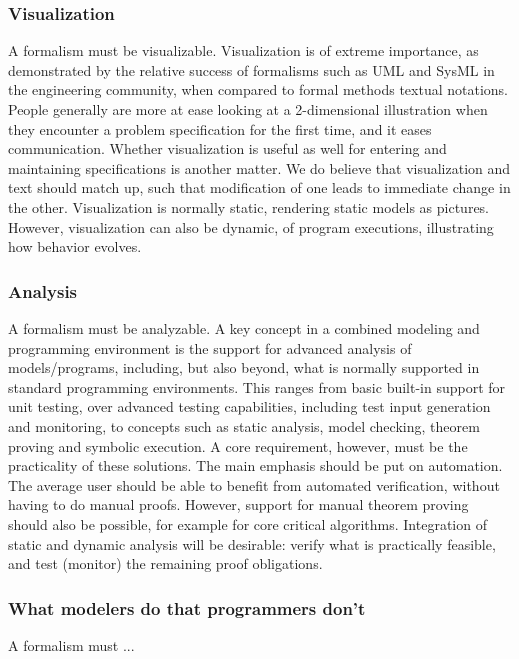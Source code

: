 \subsubsection{Visualization}

A formalism must be visualizable.
Visualization is of extreme importance, as demonstrated by the 
relative success of formalisms such as UML and SysML in the 
engineering community, when compared 
to formal methods textual notations. People generally are more at 
ease looking at a 2-dimensional illustration when they encounter a 
problem specification for the first
time, and it eases communication. Whether visualization is useful 
as well for entering
and maintaining specifications is another matter. We do believe 
that visualization and 
text should match up, such that modification of one leads to 
immediate change in the 
other. Visualization is normally static, rendering static models as
pictures. However, visualization can also be dynamic, of program 
executions, illustrating how behavior evolves.

\subsubsection{Analysis}

A formalism must be analyzable.
A key concept in a combined modeling and programming environment is 
the support for advanced analysis of models/programs, including, 
but also beyond, what is normally supported in standard programming 
environments. This ranges from basic built-in support for unit 
testing, over advanced testing capabilities, including test input 
generation and monitoring, to concepts such as static analysis, 
model checking, theorem proving and symbolic execution. A core 
requirement, however, must be the practicality of these solutions. 
The main emphasis should be put on automation. The average user 
should be able to benefit from automated verification, without 
having to do manual proofs. However, support for manual theorem 
proving should also be possible, for example for core critical 
algorithms. Integration of static and dynamic analysis will be 
desirable: verify what is practically feasible, and test (monitor) 
the remaining proof obligations.

\subsubsection{What modelers do that programmers don't}

A formalism must ...

